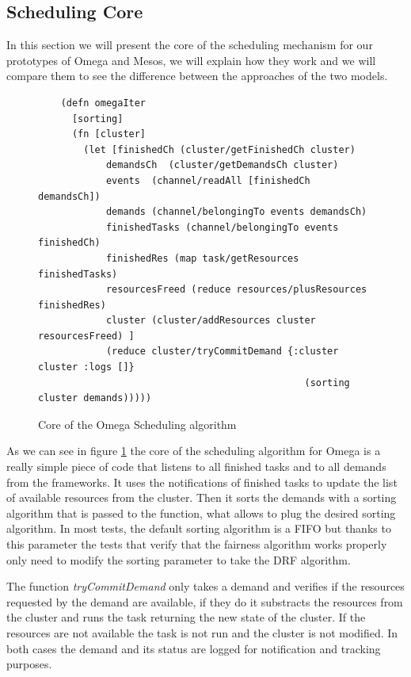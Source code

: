 \documentclass{svjour3}                     %
\begin{document}
\subsection{Scheduling Core}

In this section we will present the core of the scheduling mechanism
for our prototypes of Omega and Mesos, we will explain how they work
and we will compare them to see the difference between the approaches
of the two models.


\begin{figure}[!ht]
\centering
\begin{verbatim}
    (defn omegaIter
      [sorting]
      (fn [cluster]
        (let [finishedCh (cluster/getFinishedCh cluster)
            demandsCh  (cluster/getDemandsCh cluster)
            events  (channel/readAll [finishedCh demandsCh])
            demands (channel/belongingTo events demandsCh)
            finishedTasks (channel/belongingTo events finishedCh)
            finishedRes (map task/getResources finishedTasks)
            resourcesFreed (reduce resources/plusResources finishedRes)
            cluster (cluster/addResources cluster resourcesFreed) ]
            (reduce cluster/tryCommitDemand {:cluster cluster :logs []} 
                                               (sorting cluster demands)))))

\end{verbatim}
\caption{Core of the Omega Scheduling algorithm}
\label{fig:omega-implementation}
\end{figure}

As we can see in figure \ref{fig:omega-implementation} the core of the
scheduling algorithm for Omega is a really simple piece of code that
listens to all finished tasks and to all demands from the
frameworks. It uses the notifications of finished tasks to update the 
list of available resources from the cluster. Then it sorts the
demands with a sorting algorithm that is passed to the function, what
allows to plug the desired sorting algorithm. In most tests, the
default sorting algorithm is a FIFO but thanks to this parameter the
tests that verify that the fairness algorithm works properly only need
to modify the sorting parameter to take the DRF algorithm.

The function \emph{tryCommitDemand} only takes a demand and verifies
if the resources requested by the demand are available, if they do it
substracts the resources from the cluster and runs the task returning
the new state of the cluster. If the resources are not available the
task is not run and the cluster is not modified. In both cases the
demand and its status are logged for notification and tracking
purposes. 
\end{document}
